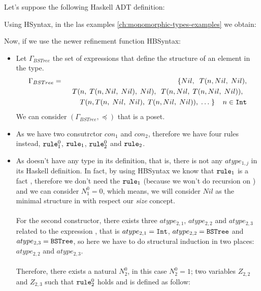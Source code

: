 	\begin{example}
		Let's suppose the following Haskell ADT definition:
		
		Using HSyntax, in the las examples \ref{ch:monomorphic-types-examples} we obtain:
		
		Now, if we use the newer refinement function HBSyntax:
		\begin{itemize}
			\item Let $\Gamma_{BSTree}$ the set of expressions that define the structure of an element in the  type.
			      \begin{eqnarray*}
			      	\Gamma_{BSTree} & = & \{ Nil, \;\; T(n, Nil, \; Nil), \\
			      	&& \;\; T(n, \; T(n, Nil, \; Nil), \; Nil), \;\; T(n, Nil, \; T(n, Nil, \; Nil)), \;\;  \\
			      	&& \;\; T(n, T(n, \; Nil, \; Nil), \; T(n, Nil, \; Nil)), \; \ldots \; \} \;\; \;\; n \in \texttt{Int}
			      \end{eqnarray*}
			      We can consider $(\Gamma_{BSTree}, \preceq)$ that is a poset.
			\item As we have two consutrctor $con_1$ and $con_2$, therefore we have four rules instead, $\texttt{rule}_{1}^{0}$, $\texttt{rule}_1$, $\texttt{rule}_{2}^{0}$ and $\texttt{rule}_2$.
			\item As  doesn't have any type in its definition, that is, there is not any $atype_{1,j}$ in its Haskell definition. In fact, by using HBSyntax we know that $\texttt{rule}_1$ is a fact , therefore we don't need the $\texttt{rule}_1$ (because we won't do recursion on ) and we can consider $N_{1}^{0} = 0$, which means, we will consider $Nil$ as the minimal structure in  with respect our \textit{size} concept.\\\\
			      For the second constructor, there exists three $atype_{2,1}$, $atype_{2,2}$ and $atype_{2,3}$ related to the expression , that is $atype_{2,1} = \texttt{Int}$, $atype_{2,2} = \texttt{BSTree}$ and $atype_{2,3} = \texttt{BSTree}$, so here we have to do structural induction in two places: $atype_{2,2}$ and $atype_{2,3}$.\\\\
			      Therefore, there exists a natural $N_{2}^{0}$, in this case $N_{2}^{0} = 1$; two variables $Z_{2,2}$ and $Z_{2,3}$ such that $\texttt{rule}_{2}^{0}$ holds and is defined as follow:

\end{itemize}
\end{example}
